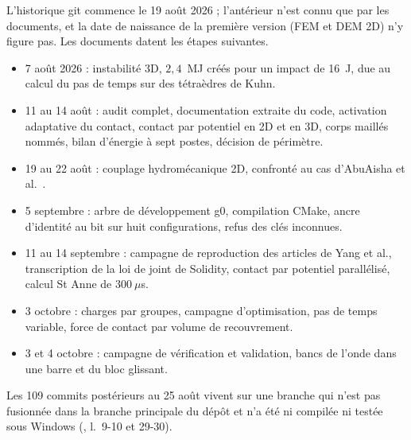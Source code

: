 L'historique git commence le 19 août 2026 ; l'antérieur n'est connu que par les documents, et la date de naissance de la première version (FEM et DEM 2D) n'y figure pas. Les documents datent les étapes suivantes.
\begin{itemize}
\item 7 août 2026 : instabilité 3D, $2{,}4$~MJ créés pour un impact de 16~J, due au calcul du pas de temps sur des tétraèdres de Kuhn.
\item 11 au 14 août : audit complet, documentation extraite du code, activation adaptative du contact, contact par potentiel en 2D et en 3D, corps maillés nommés, bilan d'énergie à sept postes, décision de périmètre.
\item 19 au 22 août : couplage hydromécanique 2D, confronté au cas d'AbuAisha et al.~\cite{abuaisha2017hm}.
\item 5 septembre : arbre de développement g0, compilation CMake, ancre d'identité au bit sur huit configurations, refus des clés inconnues.
\item 11 au 14 septembre : campagne de reproduction des articles de Yang et al., transcription de la loi de joint de Solidity, contact par potentiel parallélisé, calcul St Anne de $300~\mu$s.
\item 3 octobre : charges par groupes, campagne d'optimisation, pas de temps variable, force de contact par volume de recouvrement.
\item 3 et 4 octobre : campagne de vérification et validation, bancs de l'onde dans une barre et du bloc glissant.
\end{itemize}
Les 109 commits postérieurs au 25 août vivent sur une branche qui n'est pas fusionnée dans la branche principale du dépôt et n'a été ni compilée ni testée sous Windows (, l.~9-10 et 29-30).
